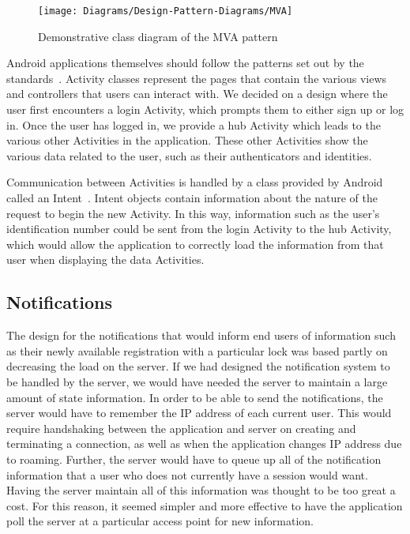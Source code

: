 \documentclass[12pt]{report}
\let\Oldsubsection\subsection
\renewcommand{\subsection}{\FloatBarrier\Oldsubsection}
\begin{document}
\begin{figure}
    \centering
    \texttt{[image: Diagrams/Design-Pattern-Diagrams/MVA]}
    \caption{Demonstrative class diagram of the MVA pattern}
    \label{fig:MVA}
\end{figure}

Android applications themselves should follow the patterns set out by the standards~\autocite{ANDROIDSTANDARD}. Activity classes represent the
pages that contain the various views and controllers that users can interact with. We decided on a design where the user
first encounters a login Activity, which prompts them to either sign up or log in. Once the user has logged in, we
provide a hub Activity which leads to the various other Activities in the application. These other Activities show the
various data related to the user, such as their authenticators and identities.

Communication between Activities is handled by a class provided by Android called an Intent~\autocite{ANDROIDINTENT}. Intent objects contain
information about the nature of the request to begin the new Activity. In this way, information such as the user's
identification number could be sent from the login Activity to the hub Activity, which would allow the application to
correctly load the information from that user when displaying the data Activities.


\subsection{Notifications} \label{notifications}

The design for the notifications that would inform end users of information such as their newly available registration
with a particular lock was based partly on decreasing the load on the server. If we had designed the notification system to
be handled by the server, we would have needed the server to maintain a large amount of state information. In order to
be able to send the notifications, the server would have to remember the IP address of each current user. This would
require handshaking between the application and server on creating and terminating a connection, as well as when the
application changes IP address due to roaming. Further, the server would have to queue up all of the notification
information that a user who does not currently have a session would want. Having the server maintain all of this
information was thought to be too great a cost. For this reason, it seemed simpler and more effective to have the
application poll the server at a particular access point for new information.
\end{document}
